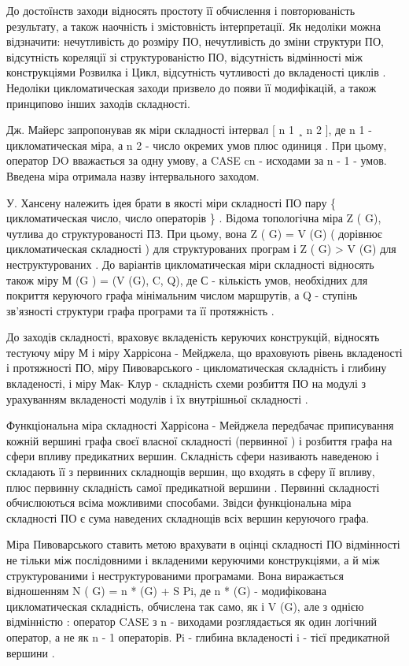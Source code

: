 До достоїнств заходи відносять простоту її обчислення і повторюваність результату, а також наочність і змістовність інтерпретації. Як недоліки можна відзначити: нечутливість до розміру ПО, нечутливість до зміни структури ПО, відсутність кореляції зі структурованістю ПО, відсутність відмінності між конструкціями Розвилка і Цикл, відсутність чутливості до вкладеності циклів . Недоліки цикломатическая заходи призвело до появи її модифікацій, а також принципово інших заходів складності.

Дж. Майерс запропонував як міри складності інтервал {[} n 1 ¸ n 2 {]}, де n 1 - цикломатическая міра, а n 2 - число окремих умов плюс одиниця . При цьому, оператор DO вважається за одну умову, а CASE cn - исходами за n - 1 - умов. Введена міра отримала назву інтервального заходом.

У. Хансену належить ідея брати в якості міри складності ПО пару \{ цикломатическая число, число операторів \} . Відома топологічна міра Z ( G), чутлива до структурованості ПЗ. При цьому, вона Z ( G) = V (G) ( дорівнює цикломатическая складності ) для структурованих програм і Z ( G) \textgreater{} V (G) для неструктурованих . До варіантів цикломатическая міри складності відносять також міру М (G ) = (V (G), C, Q), де С - кількість умов, необхідних для покриття керуючого графа мінімальним числом маршрутів, а Q - ступінь зв'язності структури графа програми та її протяжність .

До заходів складності, враховує вкладеність керуючих конструкцій, відносять тестуючу міру М і міру Харрісона - Мейджела, що враховують рівень вкладеності і протяжності ПО, міру Пивоварського - цикломатическая складність і глибину вкладеності, і міру Мак- Клур - складність схеми розбиття ПО на модулі з урахуванням вкладеності модулів і їх внутрішньої складності .

Функціональна міра складності Харрісона - Мейджела передбачає приписування кожній вершині графа своєї власної складності (первинної ) і розбиття графа на сфери впливу предикатних вершин. Складність сфери називають наведеною і складають її з первинних складнощів вершин, що входять в сферу її впливу, плюс первинну складність самої предикатной вершини . Первинні складності обчислюються всіма можливими способами. Звідси функціональна міра складності ПО є сума наведених складнощів всіх вершин керуючого графа.

Міра Пивоварського ставить метою врахувати в оцінці складності ПО відмінності не тільки між послідовними і вкладеними керуючими конструкціями, а й між структурованими і неструктурованими програмами. Вона виражається відношенням N ( G) = n * (G) + S Pi, де n * (G) - модифікована цикломатическая складність, обчислена так само, як і V (G), але з однією відмінністю : оператор CASE з n - виходами розглядається як один логічний оператор, а не як n - 1 операторів. Рi - глибина вкладеності i - тієї предикатной вершини .

